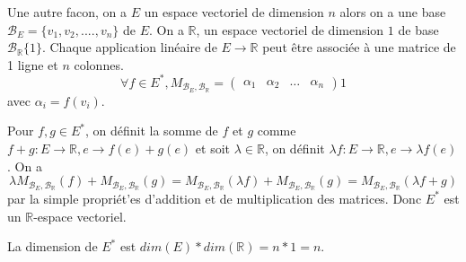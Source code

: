 \documentclass[]{book}
\theoremstyle{definition}
\newcommand{\bb}[1]{\mathbb{#1}}
\newcommand{\R}{\bb{R}}
\begin{document}
Une autre facon, on a $E$ un espace vectoriel de dimension $n$ alors on a une base $\mathcal{B}_{E} = \{v_1, v_2, ...., v_n\}$ de $E$. On a $\R$, un espace vectoriel de dimension $1$ de base $\mathcal{B}_{\R}\{1\}$. Chaque application lin\'eaire de $E \to \R$ peut \^etre associ\'ee \`a une matrice de 1 ligne et $n$ colonnes. 
$$
\forall f \in E^{*},  M_{\mathcal{B}_{E}, \mathcal{B}_{\R}} = \begin{pmatrix} \alpha_1 & \alpha_2 & \ldots & \alpha_n  \end{pmatrix} 1
$$
avec $\alpha_i = f(v_i)$.

Pour $f, g \in E^{*}$, on d\'efinit la somme de $f$ et $g$ comme $f+g : E \to \R, e \to f(e) + g(e)$ et soit $\lambda \in \R$, on d\'efinit $\lambda f : E \to \R, e \to \lambda f(e)$. On a 
$$
 \lambda M_{\mathcal{B}_{E}, \mathcal{B}_{\R}}(f) + M_{\mathcal{B}_{E}, \mathcal{B}_{\R}}(g) = M_{\mathcal{B}_{E}, \mathcal{B}_{\R}}(\lambda f) + M_{\mathcal{B}_{E}, \mathcal{B}_{\R}}(g) = M_{\mathcal{B}_{E}, \mathcal{B}_{\R}} (\lambda f + g) 
$$
par la simple propri\'et'es d'addition et de multiplication des matrices. Donc $E^{*}$ est un $\R$-espace vectoriel.

La dimension de $E^{*}$ est $dim(E) * dim(\R) = n*1 = n$.
\end{document}
